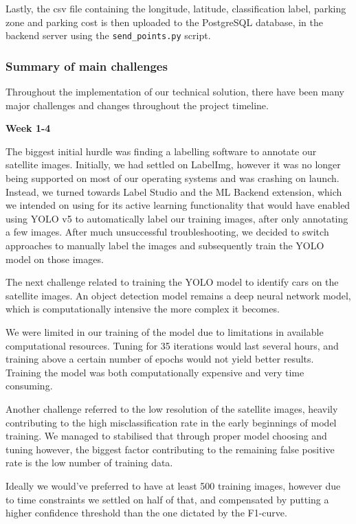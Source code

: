 Lastly, the csv file containing the longitude, latitude, classification label, parking
zone and parking cost is then uploaded to the PostgreSQL database, in the
backend server using the \texttt{send\_points.py} script.

\newpage{}

\subsubsection{Summary of main challenges}
Throughout the implementation of our technical solution, there have been many
major challenges and changes throughout the project timeline.

\textbf{Week 1-4}

The biggest initial hurdle was finding a labelling software to annotate our
satellite images. Initially, we had settled on LabelImg, however it was no
longer being supported on most of our operating systems and was crashing on
launch. Instead, we turned towards Label Studio and the ML Backend extension, which we
intended on using for its active learning functionality that would have
enabled using YOLO v5 to automatically label our training images, after only
annotating a few images. After much unsuccessful troubleshooting, we decided to switch
approaches to manually label the images and subsequently train the YOLO model on
those images.

The next challenge related to training the YOLO model to identify cars on the
satellite images. An object detection model remains a deep neural network model,
which is computationally intensive the more complex it becomes.

We were limited in our training of the model due to limitations in available
computational resources. Tuning for 35 iterations would last several hours, and
training above a certain number of epochs would not yield better results.
Training the model was both computationally expensive and very time consuming.

Another challenge referred to the low resolution of the satellite images,
heavily contributing to the high misclassification rate in the early beginnings of
model training. We managed to stabilised that through proper model choosing and
tuning however, the biggest factor contributing to the remaining false positive
rate is the low number of training data.

Ideally we would've preferred to have at least 500 training images, however due
to time constraints we settled on half of that, and compensated by putting a
higher confidence threshold than the one dictated by the F1-curve.

